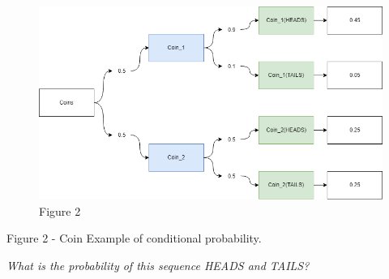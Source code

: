 \documentclass[]{book}
\begin{document}
\begin{figure}
\centering
\includegraphics{01-img/c4_l6_02.png}
\caption{Figure 2}
\end{figure}

Figure 2 - Coin Example of conditional probability.

\emph{What is the probability of this sequence HEADS and TAILS?}
\end{document}
